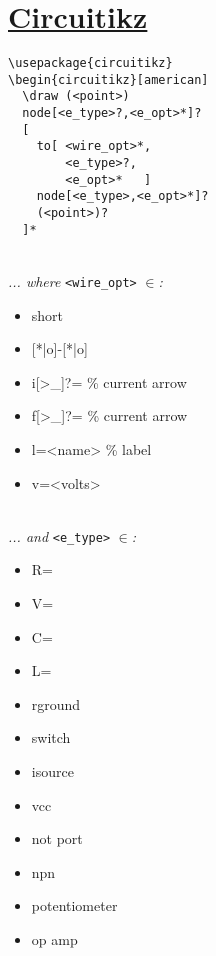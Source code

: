\section{\href{http://mirrors.ctan.org/graphics/pgf/contrib/circuitikz/doc/circuitikzmanual.pdf}{Circuitikz}}

\begin{minipage}{6.5cm}
\begin{lstlisting}
\usepackage{circuitikz}
\begin{circuitikz}[american]
  \draw (<point>) 
  node[<e_type>?,<e_opt>*]?
  [
    to[ <wire_opt>*,
        <e_type>?,
        <e_opt>*   ] 
    node[<e_type>,<e_opt>*]? 
    (<point>)?     
  ]*
\end{lstlisting}
\end{minipage}\ \\

\textit{... where }\texttt{<wire\_opt>}\textit{ $\in$:}\\ 
\begin{itemize}
    \item short
    \item {[*|o]}-[*|o]
    \item i[>\_]?= \% current arrow
    \item f[>\_]?= \% current arrow
    \item l=<name> \% label
    \item v=<volts>
\end{itemize}\ \\

\textit{... and }\texttt{<e\_type>}\textit{ $\in$:}\\ 
\begin{multicols}{2}
\begin{itemize}
    \item R=
    \item V=
    \item C=
    \item L=
    \item rground
    \item switch
    \item isource
    \item vcc
    \item not port
    \item npn
    \item potentiometer
    \item op amp
\end{itemize}
\end{multicols}\ \\

